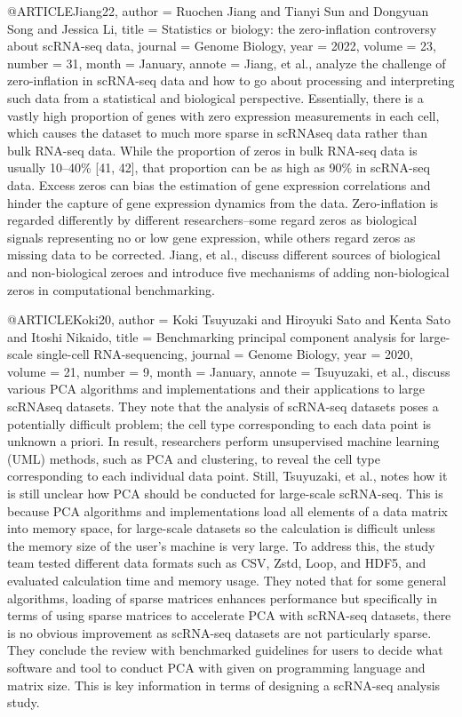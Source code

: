 @ARTICLE{Jiang22,
  author    = {Ruochen Jiang and Tianyi Sun and Dongyuan Song and Jessica Li},
  title     = {Statistics or biology: the zero-inflation controversy about scRNA-seq data},
  journal   = {Genome Biology},
  year      = {2022},
  volume    = {23},
  number    = {31},
  month     = {January},
  annote    = {Jiang, et al., analyze the challenge of zero-inflation in scRNA-seq data and how to go about processing and interpreting such data from a statistical and biological perspective. Essentially, there is a vastly high proportion of genes with zero expression measurements in each cell, which causes the dataset to much more sparse in scRNAseq data rather than bulk RNA-seq data. While the proportion of zeros in bulk RNA-seq data is usually 10–40\% [41, 42], that proportion can be as high as 90\% in scRNA-seq data. Excess zeros can bias the estimation of gene expression correlations  and hinder the capture of gene expression dynamics from the data. Zero-inflation is regarded differently by different researchers–some regard zeros as biological signals representing no or low gene expression, while others regard zeros as missing data to be corrected. Jiang, et al., discuss different sources of biological and non-biological zeroes and introduce five mechanisms of adding non-biological zeros in computational benchmarking.
}
}

@ARTICLE{Koki20,
  author    = {Koki Tsuyuzaki and Hiroyuki Sato and Kenta Sato and Itoshi Nikaido},
  title     = {Benchmarking principal component analysis for large-scale single-cell RNA-sequencing},
  journal   = {Genome Biology},
  year      = {2020},
  volume    = {21},
  number    = {9},
  month     = {January},
  annote    = {Tsuyuzaki, et al., discuss various PCA algorithms and implementations and their applications to large scRNAseq datasets. They note that the analysis of scRNA-seq datasets poses a potentially difficult problem; the cell type corresponding to each data point is unknown a priori. In result, researchers perform unsupervised machine learning (UML) methods, such as PCA and clustering, to reveal the cell type corresponding to each individual data point. Still, Tsuyuzaki, et al., notes how it is still unclear how PCA should be conducted for large-scale scRNA-seq. This is because PCA algorithms and implementations load all elements of a data matrix into memory space, for large-scale datasets so the calculation is difficult unless the memory size of the user’s machine is very large. To address this, the study team tested different data formats such as CSV, Zstd, Loop, and HDF5, and evaluated calculation time and memory usage. They noted that for some general algorithms, loading of sparse matrices enhances performance but specifically in terms of using sparse matrices to accelerate PCA with scRNA-seq datasets, there is no obvious improvement as scRNA-seq datasets are not particularly sparse. They conclude the review with benchmarked guidelines for users to decide what software and tool to conduct PCA with given on programming language and matrix size. This is key information in terms of designing a scRNA-seq analysis study.
}
}



